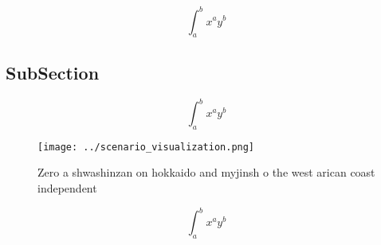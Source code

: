 \documentclass[a4paper]{article}
\begin{document}
\[ \int_{a}^{b}{x^{a}y^{b}} \]

\subsection{SubSection}

\[ \int_{a}^{b}{x^{a}y^{b}} \]

\begin{figure}
\centering
\texttt{[image: ../scenario\_visualization.png]}
\caption{Zero a shwashinzan on hokkaido and myjinsh o the west arican coast independent 
}
\end{figure}
 
\[ \int_{a}^{b}{x^{a}y^{b}} \]
\end{document}
